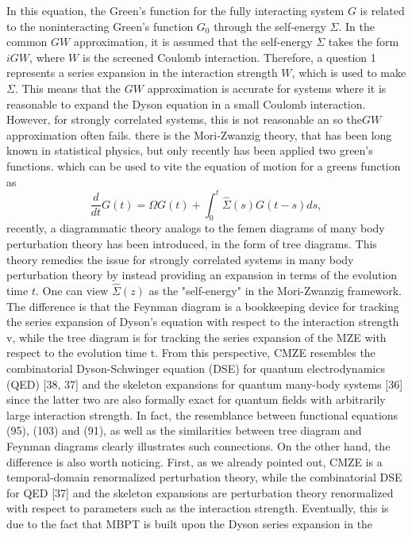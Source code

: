 \documentclass[11pt]{article} %
\begin{document}
In this equation, the Green's function for the fully interacting system \( G \) is related to the noninteracting Green's function \( G_0 \) through the self-energy \( \Sigma \). In the common \( GW \) approximation, it is assumed that the self-energy \( \Sigma \) takes the form \( iGW \), where \( W \) is the screened Coulomb interaction. Therefore, a question 1 represents a series expansion in the interaction strength $W$, which is used to make $\Sigma $. This means that the \( GW \) approximation is accurate for systems where it is reasonable to expand the Dyson equation in a small Coulomb interaction. However, for strongly correlated systems, this is not reasonable an so the$GW$ approximation often fails.  there is the Mori-Zwanzig theory, that has been long known in statistical physics, but only recently has been applied two green's functions. which can be used to vite the equation of motion for a greens function as
\begin{equation}
\frac{d}{d t} G(t)=\Omega G(t)+\int_0^t \hat{\Sigma}(s) G(t-s) d s,
\end{equation}
recently, a diagrammatic theory analogs to the femen diagrams of many body perturbation theory has been introduced, in the form of tree diagrams. This theory remedies the issue for strongly correlated systems in many body perturbation theory by instead providing an expansion in terms of the evolution time $t$.  One can view \( \hat{\Sigma}(z) \) as the "self-energy" in the Mori-Zwanzig framework.
The difference is that the Feynman
diagram is a bookkeeping device for tracking the series expansion of Dyson’s equation with respect to the
interaction strength v, while the tree diagram is for tracking the series expansion of the MZE with respect
to the evolution time t. 
From this perspective, CMZE resembles the combinatorial Dyson-Schwinger equation (DSE)
for quantum electrodynamics (QED) [38, 37] and the skeleton expansions for quantum many-body systems
[36] since the latter two are also formally exact for quantum fields with arbitrarily large interaction strength.
In fact, the resemblance between functional equations (95), (103) and (91), as well as the similarities between
tree diagram and Feynman diagrams clearly illustrates such connections.
On the other hand, the difference is also worth noticing. First, as we already pointed out, CMZE is
a temporal-domain renormalized perturbation theory, while the combinatorial DSE for QED [37] and the
skeleton expansions are perturbation theory renormalized with respect to parameters such as the interaction
strength. Eventually, this is due to the fact that MBPT is built upon the Dyson series expansion in the
\end{document}
